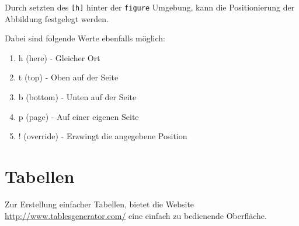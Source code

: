 Durch setzten des \verb|[h]| hinter der \verb|figure| Umgebung, kann die Positionierung der Abbildung festgelegt werden.\par\medskip

Dabei sind folgende Werte ebenfalls möglich:

\begin{enumerate}
	\item h (here) - Gleicher Ort
	\item t (top) - Oben auf der Seite
	\item b (bottom) - Unten auf der Seite
	\item p (page) - Auf einer eigenen Seite
	\item ! (override) - Erzwingt die angegebene Position
\end{enumerate}

\section{Tabellen}\label{sec:tab}

Zur Erstellung einfacher Tabellen, bietet die Website \url{http://www.tablesgenerator.com/} eine einfach zu bedienende Oberfläche. \par\medskip %

